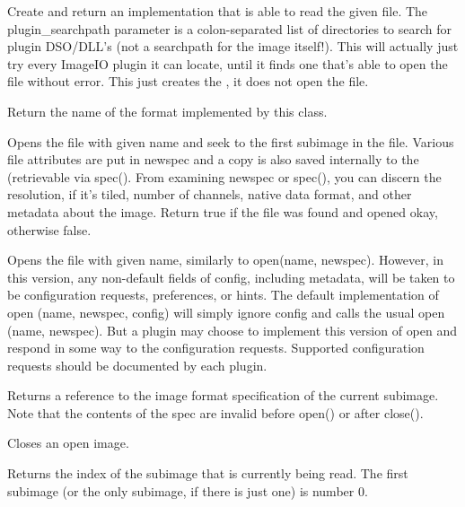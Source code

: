 Create and return an \ImageInput implementation that is able
to read the given file.  The {\kw plugin_searchpath} parameter is a
colon-separated list of directories to search for \product plugin
DSO/DLL's (not a searchpath for the image itself!).  This will
actually just try every ImageIO plugin it can locate, until it
finds one that's able to open the file without error.  This just
creates the \ImageInput, it does not open the file.
\apiend

Return the name of the format implemented by this class.
\apiend

Opens the file with given name and seek to the first subimage in the
file.  Various file attributes are put in
{\kw newspec} and a copy is also saved internally to the
\ImageInput (retrievable via {\kw spec()}.  From examining
{\kw newspec} or {\kw spec()}, you can discern the resolution, if it's
tiled, number of channels, native data format, and other metadata about
the image.  Return {\kw true} if the file was found and opened okay,
otherwise {\kw false}.
\apiend


Opens the file with given name, similarly to {\cf open(name, newspec)}.
However, in this version, any non-default fields of {\cf config},
including metadata, will be taken to be configuration requests,
preferences, or hints.  The default implementation of 
{\cf open (name, newspec, config)} will simply ignore {\cf config} and
calls the usual {\cf open (name, newspec)}.  But a plugin may choose to
implement this version of {\cf open} and respond in some way to the
configuration requests.  Supported configuration requests should be
documented by each plugin.
\apiend

Returns a reference to the image format specification of the
current subimage.  Note that the contents of the spec are
invalid before {\kw open()} or after {\kw close()}.
\apiend

Closes an open image.
\apiend


Returns the index of the subimage that is currently being read.
The first subimage (or the only subimage, if there is just one) is
number 0.
\apiend


